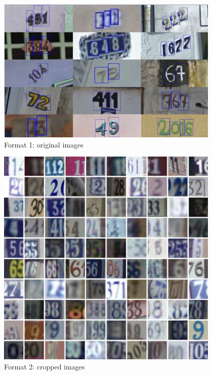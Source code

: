 \documentclass{article}
\begin{document}
\begin{figure}[H]
    \centering
    \begin{minipage}{0.32\textwidth}
        \includegraphics[width=0.95\textwidth]{fig/1.png}
        Format 1: original images
    \end{minipage}
    \begin{minipage}{0.32\textwidth}
        \includegraphics[width=0.95\textwidth]{fig/2.png}
        Format 2: cropped images
    \end{minipage}
    \begin{minipage}{0.32\textwidth}

\end{minipage}
\end{figure}
\end{document}
